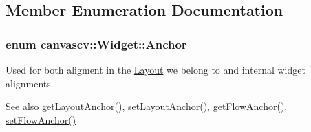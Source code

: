 \subsection{Member Enumeration Documentation}
\subsubsection[{\texorpdfstring{Anchor}{Anchor}}]{\setlength{\rightskip}{0pt plus 5cm}enum {\bf canvascv\+::\+Widget\+::\+Anchor}}\hypertarget{classcanvascv_1_1Widget_a98ca3c300ba50b316fa5a1d300456abe}{}\label{classcanvascv_1_1Widget_a98ca3c300ba50b316fa5a1d300456abe}
Used for both aligment in the \hyperlink{classcanvascv_1_1Layout}{Layout} we belong to and internal widget alignments \begin{DoxySeeAlso}{See also}
\hyperlink{classcanvascv_1_1Widget_a3b460d40be2a634153bf0785c46383b9}{get\+Layout\+Anchor()}, \hyperlink{classcanvascv_1_1Widget_a7180ca0054874c853e805e7842741596}{set\+Layout\+Anchor()}, \hyperlink{classcanvascv_1_1Widget_a4956e8b0ced615c3177dc38f553732fb}{get\+Flow\+Anchor()}, \hyperlink{classcanvascv_1_1Widget_a69f455f7fbf67f636ee1155795057b87}{set\+Flow\+Anchor()} 
\end{DoxySeeAlso}
